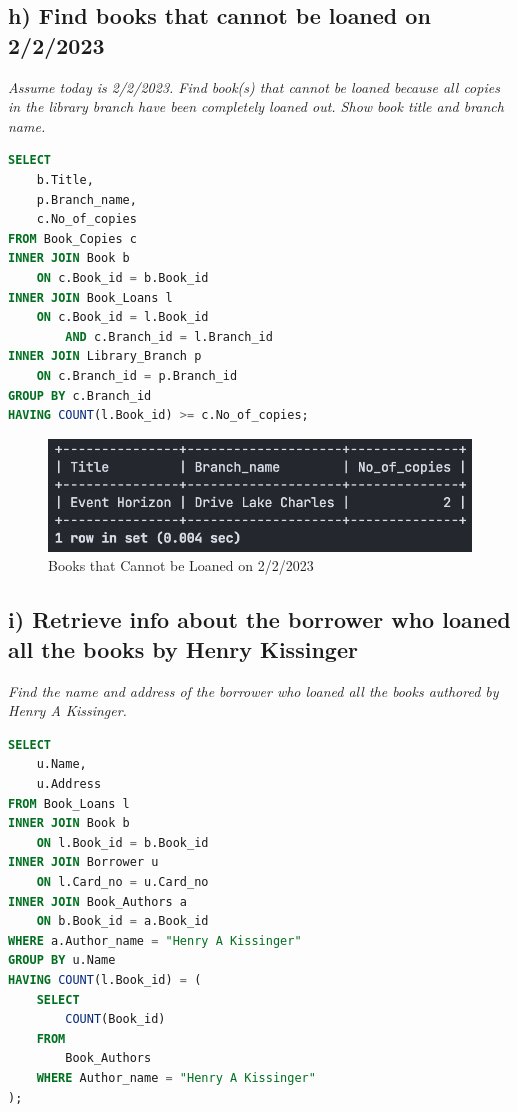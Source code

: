 \documentclass{article}
\begin{document}
\newpage
\subsection{h) Find books that cannot be loaned on 2/2/2023}

\textit{Assume today is 2/2/2023. Find book(s) that cannot be loaned because all copies in the
library branch have been completely loaned out. Show book title and branch name.}

\begin{lstlisting}[language=SQL,
    deletekeywords={IDENTITY},
    deletekeywords={[2]INT},
    morekeywords={clustered},
    framesep=8pt,
    xleftmargin=40pt,
    framexleftmargin=40pt,
    frame=tb,
    framerule=0pt ]
SELECT
    b.Title,
    p.Branch_name,
    c.No_of_copies
FROM Book_Copies c
INNER JOIN Book b
    ON c.Book_id = b.Book_id
INNER JOIN Book_Loans l
    ON c.Book_id = l.Book_id
        AND c.Branch_id = l.Branch_id
INNER JOIN Library_Branch p
    ON c.Branch_id = p.Branch_id
GROUP BY c.Branch_id
HAVING COUNT(l.Book_id) >= c.No_of_copies; 
\end{lstlisting}

\begin{figure}[!h]
    \centering
    \includegraphics[scale=0.6]{images/q4-h-results.png}
    \caption{Books that Cannot be Loaned on 2/2/2023}
    \label{fig:q4_h_books}
\end{figure}

\subsection{i) Retrieve info about the borrower who loaned all the books by Henry Kissinger}

\textit{Find the name and address of the borrower who loaned all the books authored by Henry
A Kissinger.}

\begin{lstlisting}[language=SQL,
    deletekeywords={IDENTITY},
    deletekeywords={[2]INT},
    morekeywords={clustered},
    framesep=8pt,
    xleftmargin=40pt,
    framexleftmargin=40pt,
    frame=tb,
    framerule=0pt ]
SELECT
    u.Name,
    u.Address
FROM Book_Loans l
INNER JOIN Book b
    ON l.Book_id = b.Book_id
INNER JOIN Borrower u
    ON l.Card_no = u.Card_no
INNER JOIN Book_Authors a
    ON b.Book_id = a.Book_id
WHERE a.Author_name = "Henry A Kissinger"
GROUP BY u.Name
HAVING COUNT(l.Book_id) = (
    SELECT
        COUNT(Book_id)
    FROM
        Book_Authors
    WHERE Author_name = "Henry A Kissinger"
); 
\end{lstlisting}
\end{document}
